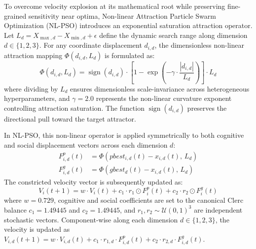 \documentclass[10pt]{article}
\begin{document}
To overcome velocity explosion at its mathematical root while preserving fine-grained sensitivity near optima, Non-linear Attraction Particle Swarm Optimization (NL-PSO) introduces an exponential saturation attraction operator. Let $L_d = X_{\max,d} - X_{\min,d} + \epsilon$ define the dynamic search range along dimension $d \in \{1, 2, 3\}$. For any coordinate displacement $d_{i,d}$, the dimensionless non-linear attraction mapping $\Phi(d_{i,d}, L_d)$ is formulated as:
\begin{equation}
\Phi(d_{i,d}, L_d) = \operatorname{sign}(d_{i,d}) \cdot \left[ 1 - \exp\left( -\gamma \cdot \frac{|d_{i,d}|}{L_d} \right) \right] \cdot L_d \label{eq:nl_operator}
\end{equation}
where dividing by $L_d$ ensures dimensionless scale-invariance across heterogeneous hyperparameters, and $\gamma = 2.0$ represents the non-linear curvature exponent controlling attraction saturation. The function $\operatorname{sign}(d_{i,d})$ preserves the directional pull toward the target attractor.

In NL-PSO, this non-linear operator is applied symmetrically to both cognitive and social displacement vectors across each dimension $d$:
\begin{align}
F_{i,d}^p(t) &= \Phi(pbest_{i,d}(t) - x_{i,d}(t), \, L_d) \label{eq:nl_fp} \\
F_{i,d}^g(t) &= \Phi(gbest_d(t) - x_{i,d}(t), \, L_d) \label{eq:nl_fg}
\end{align}
The constricted velocity vector is subsequently updated as:
\begin{equation}
V_i(t+1) = w \cdot V_i(t) + c_1 \cdot r_1 \odot F_i^p(t) + c_2 \cdot r_2 \odot F_i^g(t) \label{eq:nl_velocity}
\end{equation}
where $w = 0.729$, cognitive and social coefficients are set to the canonical Clerc balance $c_1 = 1.49445$ and $c_2 = 1.49445$, and $r_1, r_2 \sim \mathcal{U}(0,1)^3$ are independent stochastic vectors. Component-wise along each dimension $d \in \{1, 2, 3\}$, the velocity is updated as $V_{i,d}(t+1) = w \cdot V_{i,d}(t) + c_1 \cdot r_{1,d} \cdot F_{i,d}^p(t) + c_2 \cdot r_{2,d} \cdot F_{i,d}^g(t)$.
\end{document}
